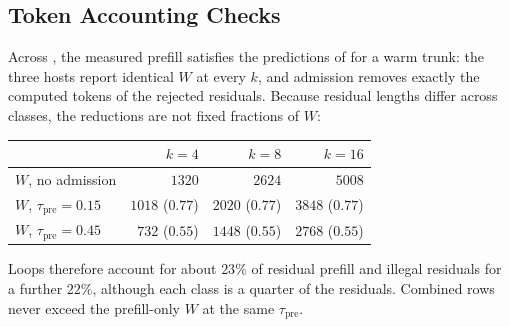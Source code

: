\subsection{Token Accounting Checks}
\label{sec:ablate-idents}

Across , the measured prefill satisfies the predictions of  for a warm trunk:
the three hosts report identical $W$ at every $k$, and admission removes exactly the computed tokens of the rejected residuals.
Because residual lengths differ across classes, the reductions are not fixed fractions of $W$:
\begin{center}
\scriptsize
\begin{tabular}{@{}lrrr@{}}
\toprule
 & $k{=}4$ & $k{=}8$ & $k{=}16$ \\
\midrule
$W$, no admission & $1320$ & $2624$ & $5008$ \\
$W$, $\tau_{\mathrm{pre}}{=}0.15$ & $1018$ ($0.77$) & $2020$ ($0.77$) & $3848$ ($0.77$) \\
$W$, $\tau_{\mathrm{pre}}{=}0.45$ & $732$ ($0.55$) & $1448$ ($0.55$) & $2768$ ($0.55$) \\
\bottomrule
\end{tabular}
\end{center}
Loops therefore account for about $23\%$ of residual prefill and illegal residuals for a further $22\%$, although each class is a quarter of the residuals.
Combined rows never exceed the prefill-only $W$ at the same $\tau_{\mathrm{pre}}$.
